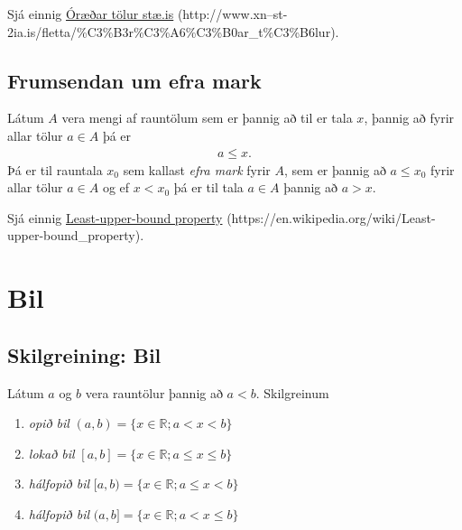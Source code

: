 \documentclass[a4paper,10pt,icelandic]{sphinxmanual}
\begin{document}
Sjá einnig \href{http://www.xn--st-2ia.is/fletta/\%C3\%B3r\%C3\%A6\%C3\%B0ar\_t\%C3\%B6lur}{Óræðar tölur \textbar{} stæ.is} (http://www.xn--st-2ia.is/fletta/\%C3\%B3r\%C3\%A6\%C3\%B0ar\_t\%C3\%B6lur).


\subsection{Frumsendan um efra mark}
\label{kafli01:frumsendanumeframark}\label{kafli01:frumsendan-um-efra-mark}\label{kafli01:index-1}
Látum \(A\) vera mengi af rauntölum sem
er þannig að til er tala \(x\), þannig að fyrir allar tölur
\(a \in A\) þá er
\begin{equation*}
\begin{split}a\leq x.\end{split}
\end{equation*}
Þá er til rauntala \(x_0\) sem kallast \textit{efra mark} fyrir
\(A\), sem er þannig að \(a\leq x_0\) fyrir allar tölur
\(a\in
A\) og ef \(x<x_0\) þá er til tala \(a\in A\) þannig að
\(a>x\).

Sjá einnig \href{https://en.wikipedia.org/wiki/Least-upper-bound\_property}{Least-upper-bound property} (https://en.wikipedia.org/wiki/Least-upper-bound\_property).


\section{Bil}
\label{kafli01:bil}\label{kafli01:skilgreining-1-3-1}

\subsection{Skilgreining: Bil}
\label{kafli01:index-2}\label{kafli01:skilgreining-bil}
Látum \(a\) og \(b\) vera rauntölur þannig að
\(a<b\). Skilgreinum
\begin{enumerate}
\item {} 
\emph{opið bil} \((a,b)=\{x\in \mathbb{R}; a<x<b\}\)

\item {} 
\emph{lokað bil} \([a,b]=\{x\in \mathbb{R}; a\leq x\leq b\}\)

\item {} 
\emph{hálfopið bil} \([a,b)=\{x\in \mathbb{R}; a\leq x<b\}\)

\item {} 
\emph{hálfopið bil} \((a,b]=\{x\in \mathbb{R}; a< x\leq b\}\)

\end{enumerate}
\end{document}
